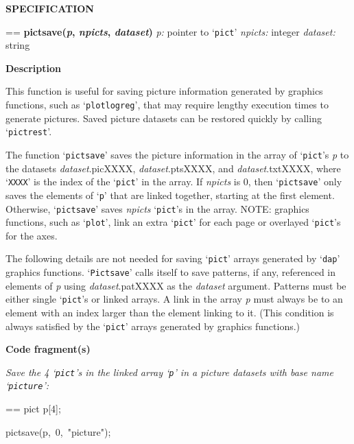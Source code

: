 \documentclass{book}
\makeatletter
\newcommand\Texinfocommandstyletextvar[1]{{\normalfont{}\textsl{#1}}}%
\newenvironment{Texinfopreformatted}{%
  \par\GNUTobeylines\obeyspaces\frenchspacing\parskip=\z@\parindent=\z@}{}
{\catcode`\^^M=13 \gdef\GNUTobeylines{\catcode`\^^M=13 \def^^M{\null\par}}}
\newenvironment{Texinfoindented}{\begin{list}{}{}\item\relax}{\end{list}}
\renewcommand{\_}{\Texinfounderscore\discretionary{}{}{}}
\makeatother
\begin{document}
\noindent{}\textbf{SPECIFICATION}
\begin{Texinfoindented}
\begin{Texinfopreformatted}%
\textbf{pict\_save(\Texinfocommandstyletextvar{p}, \Texinfocommandstyletextvar{npicts}, \Texinfocommandstyletextvar{dataset})}
\Texinfocommandstyletextvar{p:} pointer to `\texttt{pict}'
\Texinfocommandstyletextvar{npicts:} integer
\Texinfocommandstyletextvar{dataset:} string
\end{Texinfopreformatted}
\end{Texinfoindented}

\noindent{}\textbf{Description}

This function is useful for saving picture information generated
by graphics functions, such as `\texttt{plotlogreg}', that may require
lengthy execution times to generate pictures.
Saved picture datasets can be restored quickly by calling `\texttt{pict\_rest}'.

The function `\texttt{pict\_save}' saves the picture information
in the array of `\texttt{pict}'s \Texinfocommandstyletextvar{p} to
the datasets \Texinfocommandstyletextvar{dataset}.picXXXX, \Texinfocommandstyletextvar{dataset}.ptsXXXX, and
\Texinfocommandstyletextvar{dataset}.txtXXXX, where `\texttt{XXXX}' is the index of the `\texttt{pict}'
in the array.
If \Texinfocommandstyletextvar{npicts} is 0, then `\texttt{pict\_save}' only saves the elements
of `\texttt{p}' that are linked together, starting at the first element.
Otherwise, `\texttt{pict\_save}' saves \Texinfocommandstyletextvar{npicts} `\texttt{pict}'s in the array.
NOTE: graphics functions, such as `\texttt{plot}', link an extra `\texttt{pict}'
for each page or overlayed `\texttt{pict}'s for the axes.

The following details are not needed for saving
`\texttt{pict}' arrays generated by `\texttt{dap}' graphics functions.
`\texttt{Pict\_save}' calls itself to save patterns,
if any, referenced in elements of \Texinfocommandstyletextvar{p}
using \Texinfocommandstyletextvar{dataset}.patXXXX as the \Texinfocommandstyletextvar{dataset} argument.
Patterns must be either single `\texttt{pict}'s or linked arrays.
A link in the array \Texinfocommandstyletextvar{p} must always be to an element with an index
larger than the element linking to it. (This condition is always satisfied
by the `\texttt{pict}' arrays generated by graphics functions.)

\noindent{}\textbf{Code fragment(s)}

\emph{Save the 4 `\texttt{pict}'s in the linked array `\texttt{p}' in a picture
datasets with base name `\texttt{picture}':}
\begin{Texinfoindented}
\begin{Texinfopreformatted}%
\ttfamily pict p[4];

pict\_save(p,\ 0,\ "picture");
\end{Texinfopreformatted}
\end{Texinfoindented}
\end{document}
